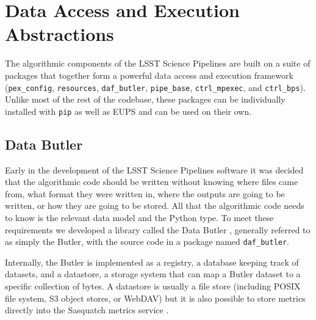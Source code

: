 \section{Data Access and Execution Abstractions}
\label{sec:middleware}

The algorithmic components of the LSST Science Pipelines are built on a suite of packages that together form a powerful data access and execution framework (\texttt{pex\_config}, \texttt{resources}, \texttt{daf\_butler}, \texttt{pipe\_base}, \texttt{ctrl\_mpexec}, and \texttt{ctrl\_bps}).
Unlike most of the rest of the codebase, these packages can be individually installed with \texttt{pip} as well as EUPS and can be used on their own.

\subsection{Data Butler}

Early in the development of the LSST Science Pipelines software it was decided that the algorithmic code should be written without knowing where files came from, what format they were written in, where the outputs are going to be written, or how they are going to be stored.
All that the algorithmic code needs to know is the relevant data model and the Python type.
To meet these requirements we developed a library called the Data Butler \citep[see e.g.,][]{2022SPIE12189E..11J,2025ASPC..538..142L}, generally referred to as simply the Butler, with the source code in a package named \texttt{daf\_butler}.

Internally, the Butler is implemented as a registry, a database keeping track of datasets, and a datastore, a storage system that can map a Butler dataset to a specific collection of bytes.
A datastore is usually a file store (including POSIX file system, S3 object stores, or WebDAV) but it is also possible to store metrics directly into the Sasquatch metrics service \citep{SQR-068,2024SPIE13101E..1MF}.

